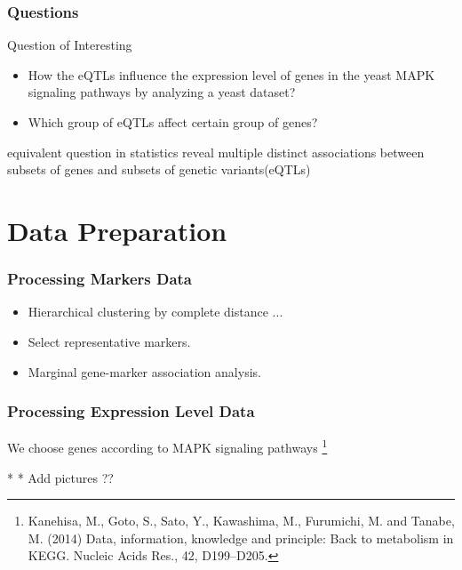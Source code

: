 \begin{frame}\frametitle{ Questions}
    \begin{block}{Question of Interesting}
        \begin{itemize}
        \item How the eQTLs influence the expression level of genes in the yeast MAPK signaling pathways by analyzing a yeast dataset?
        \item Which group of eQTLs affect certain group of genes?
        \end{itemize}
    \end{block}
    
    \begin{block}{equivalent question in statistics}
        reveal multiple distinct associations between subsets of genes and subsets of genetic variants(eQTLs)
    \end{block}
\end{frame}


\section{Data Preparation}
\begin{frame}
    \sectionpage
\end{frame}

\begin{frame}
    \frametitle{Processing Markers Data}

    \begin{itemize}
        \item Hierarchical clustering by complete distance ...
        \item Select representative markers.
        \item Marginal gene-marker association analysis.
    \end{itemize}
\end{frame}

\begin{frame}
    \frametitle{Processing Expression Level Data}

    We choose genes according to MAPK signaling pathways \footnote[2]{Kanehisa, M., Goto, S., Sato, Y., Kawashima, M., Furumichi, M. and Tanabe, M. (2014) Data, information, knowledge and principle: Back to metabolism in KEGG. Nucleic Acids Res., 42, D199–D205.}

    * * Add pictures ?? 
\end{frame}
